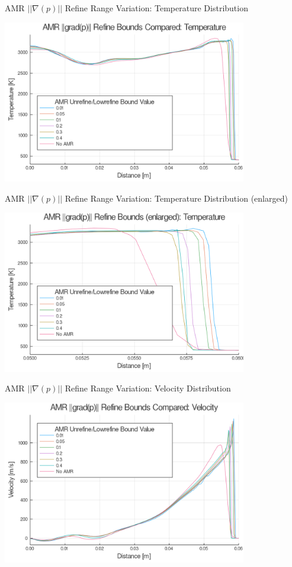 \begin{frame}{AMR $|| \nabla (p)||$ Refine Range Variation: Temperature Distribution}
\begin{center}
\includegraphics[width=0.8\textwidth]{../figs/amrfigs/amr_refinebounds/t.png}
\end{center}
\end{frame}

\begin{frame}{AMR $|| \nabla (p)||$ Refine Range Variation: Temperature Distribution (enlarged)}
\begin{center}
\includegraphics[width=0.8\textwidth]{../figs/amrfigs/amr_refinebounds/te.png}
\end{center}
\end{frame}

\begin{frame}{AMR $|| \nabla (p)||$ Refine Range Variation: Velocity Distribution}
\begin{center}
\includegraphics[width=0.8\textwidth]{../figs/amrfigs/amr_refinebounds/u.png}
\end{center}
\end{frame}

